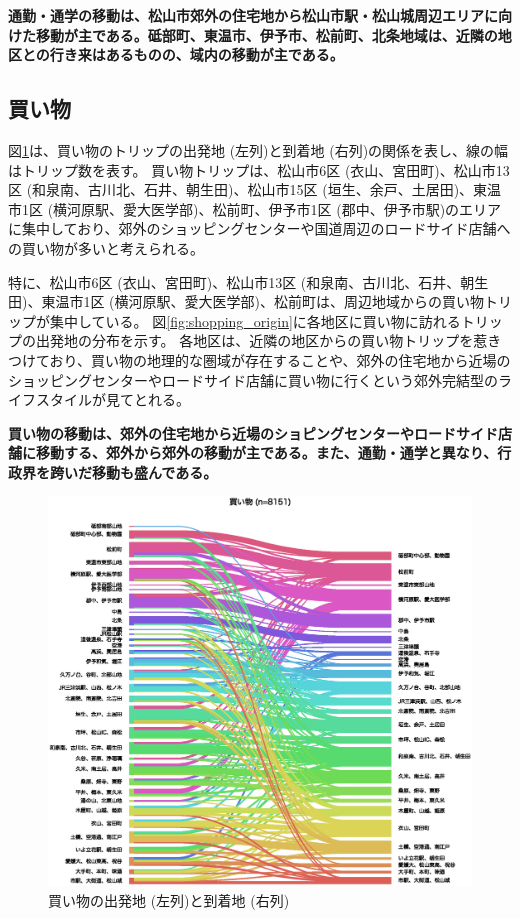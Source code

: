 \documentclass[a4paper,12pt, uplatex]{jsbook}
\begin{document}
\color{red}
\begin{framed}
\noindent
\textbf{\large 通勤・通学の移動は、松山市郊外の住宅地から松山市駅・松山城周辺エリアに向けた移動が主である。砥部町、東温市、伊予市、松前町、北条地域は、近隣の地区との行き来はあるものの、域内の移動が主である。}
\end{framed}
\color{black}

\clearpage
\subsection{買い物}
図\ref{fig:od_shopping}は、買い物のトリップの出発地 (左列)と到着地 (右列)の関係を表し、線の幅はトリップ数を表す。
買い物トリップは、松山市6区 (衣山、宮田町)、松山市13区 (和泉南、古川北、石井、朝生田)、松山市15区 (垣生、余戸、土居田)、東温市1区 (横河原駅、愛大医学部)、松前町、伊予市1区 (郡中、伊予市駅)のエリアに集中しており、郊外のショッピングセンターや国道周辺のロードサイド店舗への買い物が多いと考えられる。

特に、松山市6区 (衣山、宮田町)、松山市13区 (和泉南、古川北、石井、朝生田)、東温市1区 (横河原駅、愛大医学部)、松前町は、周辺地域からの買い物トリップが集中している。
図\ref{fig:shopping_origin}に各地区に買い物に訪れるトリップの出発地の分布を示す。
各地区は、近隣の地区からの買い物トリップを惹きつけており、買い物の地理的な圏域が存在することや、郊外の住宅地から近場のショッピングセンターやロードサイド店舗に買い物に行くという郊外完結型のライフスタイルが見てとれる。

\color{red}
\begin{framed}
\noindent
\textbf{\large 買い物の移動は、郊外の住宅地から近場のショピングセンターやロードサイド店舗に移動する、郊外から郊外の移動が主である。また、通勤・通学と異なり、行政界を跨いだ移動も盛んである。}
\end{framed}
\color{black}

\begin{figure}[htbp]
    \centering
    \includegraphics[width=1.0\textwidth]{picture/connection_買い物.eps}
    \caption{買い物の出発地 (左列)と到着地 (右列)}
    \label{fig:od_shopping}
\end{figure}
\end{document}
